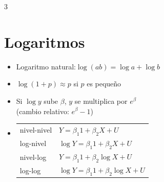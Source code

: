 \documentclass[10pt]{article}
\begin{document}
\begin{multicols}{3}
\section{Logaritmos}
\begin{itemize}
\item Logaritmo natural:\quad $\log(ab)=\log a+\log b$
\item $\log(1+p)\approx p$ si $p$ es pequeño
\item Si $\log y$ sube $\beta$, $y$ se multiplica por $e^{\beta}$\\ (cambio relativo: $e^{\beta}-1$)
\item[]\hspace{-1.1em}\begin{tabular}{@{}ll@{}}
nivel-nivel & $Y=\beta_1\mathit 1+\beta_2X+U$\\
log-nivel & $\log Y=\beta_1\mathit 1+\beta_2X+U$\\
nivel-log & $Y=\beta_1\mathit 1+\beta_2\log X+U$\\
log-log & $\log Y=\beta_1\mathit 1+\beta_2\log X+U$
\end{tabular}
\end{itemize}
\end{multicols}
\end{document}
